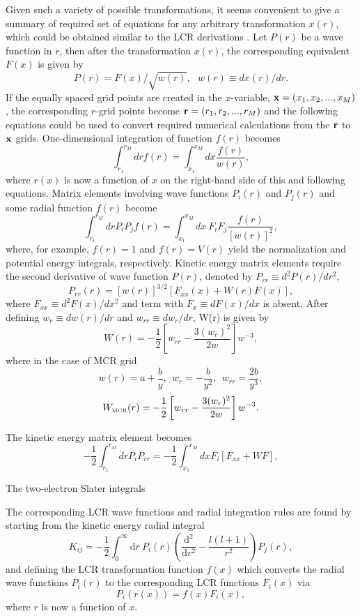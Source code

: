 \documentclass[aip
, pra
, showpacs
, aps
, twocolumn
, groupedaddress
, floatfix
]{revtex4}
\newcommand{\beq}{\begin{equation}}
\newcommand{\eeq}{\end{equation}}
\newcommand{\dd}{\mbox{d}}
\begin{document}
Given such a variety of possible transformations, it seems convenient to give 
a summary of required set of equations for any arbitrary transformation $x(r)$, 
which could be obtained similar to the LCR derivations \cite{KB10p022708}.
Let $P(r)$ be a wave function in $r$, then 
after the transformation $x(r)$, the corresponding equivalent $F(x)$ is given by
\beq
P(r) = F(x)/\sqrt{w(r)}, \ \  \ w(r) \equiv dx(r)/dr.
\eeq
If the equally spaced grid points are created in the $x$-variable, ${\bf x} = (x_1, x_2, ..., x_M)$,
the corresponding $r$-grid points become ${\bf r} = (r_1, r_2, ..., r_M)$ and 
the following equations could be used to convert required numerical calculations from the ${\bf r}$ to ${\bf x}$ grids.  
One-dimensional integration of function $f(r)$ becomes
\beq
\int_{r_1}^{r_M} dr f(r) = \int_{x_1}^{x_M} dx \frac{f(r)}{w(r)},
\eeq
where $r(x)$ is now a function of $x$ on the right-hand side of this and following equations. 
Matrix elements involving wave functions $P_i(r)$ and $P_j(r)$ and some radial function $f(r)$ become
\beq 
\int_{r_1}^{r_M} dr P_i P_j f(r) = \int_{x_1}^{x_M} dx \ F_i F_j \frac{f(r)}{[w(r)]^2},
\eeq
where, for example, $f(r)=1$ and $f(r)=V(r)$ yield the normalization and potential energy integrals, respectively.
Kinetic energy matrix elements require the second derivative of wave function $P(r)$, denoted by $P_{rr}\equiv d^2P(r)/dr^2$,
\beq
P_{rr}(r) = [w(r)]^{3/2} [F_{xx}(x)  + W(r) F(x)],
\eeq
where $F_{xx}\equiv d^2F(x)/dx^2$ and term with $F_x\equiv d F(x)/dx$ is absent. After defining 
$w_r\equiv d w(r)/dr$ and $w_{rr}\equiv d w_r/dr$, W(r) is given by
\beq
W(r) = -\frac{1}{2} \left[w_{rr} -\frac{3(w_r)^2}{2w}\right] w^{-3},
\eeq
where in the case of MCR grid 
\beq
w(r) = a + \frac{b}{y}, \ \ w_r = -\frac{b}{y^2}, \ \ w_{rr} = \frac{2b}{y^3}, 
\eeq
\beq
W_{\mbox{\tiny{MCR}}}(r) = -\frac{1}{2} \left[w_{rr} -\frac{3(w_r)^2}{2w}\right] w^{-3}.
\eeq


The kinetic energy matrix element becomes
\beq 
-\frac{1}{2}\int_{r_1}^{r_M} dr P_i P_{rr} =  -\frac{1}{2} \int_{x_1}^{x_M} dx F_i [F_{xx} +W F] ,
\eeq





The two-electron Slater integrals 



The corresponding LCR wave functions and radial integration rules are found by starting from the kinetic energy radial integral
\beq
K_{ij}=-\frac{1}{2} \int_0^{\infty} \dd r \
P_i(r) \left( \frac{\mbox{d}^2}{\mbox{d}r^2} - \frac{l(l+1)}{r^2} \right) P_j(r), \label{K_ij}
\eeq
and defining the LCR transformation function $f(x)$
which converts the radial wave functions $P_i(r)$ to the corresponding LCR functions $F_i(x)$ via
\beq
P_i \left( r(x) \right) = f(x) F_i(x), \label{P_i}
\eeq
where $r$ is now a function of $x$.
\end{document}

